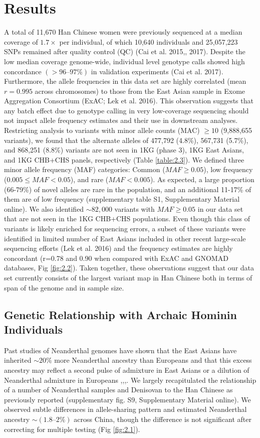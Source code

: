 \section{Results}
A total of 11,670 Han Chinese women were previously sequenced at a median coverage of $1.7\times$ per individual, of which 10,640 individuals and 25,057,223 SNPs remained after quality control (QC) (Cai et al. 2015,, 2017). Despite the low median coverage genome-wide, individual level genotype calls showed high concordance $(>96–97\%)$ in validation experiments (Cai et al. 2017). Furthermore, the allele frequencies in this data set are highly correlated (mean $r=0.995$ across chromosomes) to those from the East Asian sample in Exome Aggregation Consortium (ExAC; Lek et al. 2016). This observation suggests that any batch effect due to genotype calling in very low-coverage sequencing should not impact allele frequency estimates and their use in downstream analyses.
Restricting analysis to variants with minor allele counts (MAC) $\ge10$ (9,888,655 variants), we found that the alternate alleles of 477,792 (4.8\%), 567,731 (5.7\%), and 868,251 (8.8\%) variants are not seen in 1KG (phase 3), 1KG East Asians, and 1KG CHB+CHS panels, respectively (Table \ref{table:2.3}). We defined three minor allele frequency (MAF) categories: Common ($MAF \ge 0.05$), low frequency ($0.005\le MAF < 0.05$), and rare ($MAF < 0.005$). As expected, a large proportion (66-79\%) of novel alleles are rare in the population, and an additional 11-17\% of them are of low frequency (supplementary table S1, Supplementary Material online). We also identified $\sim82,000$ variants with $MAF \ge 0.05$ in our data set that are not seen in the 1KG CHB+CHS populations. Even though this class of variants is likely enriched for sequencing errors, a subset of these variants were identified in limited number of East Asians included in other recent large-scale sequencing efforts (Lek et al. 2016) and the frequency estimates are highly concordant (r=0.78 and 0.90 when compared with ExAC and GNOMAD databases, Fig \ref{fig:2.2}). Taken together, these observations suggest that our data set currently consists of the largest variant map in Han Chinese both in terms of span of the genome and in sample size.
\subsection{Genetic Relationship with Archaic Hominin Individuals}
Past studies of Neanderthal genomes have shown that the East Asians have inherited $\sim20\%$ more Neanderthal ancestry than Europeans and that this excess ancestry may reflect a second pulse of admixture in East Asians or a dilution of Neanderthal admixture in Europeans \cite{prfer2014complete},\cite{sankararaman2014genomic},\cite{vernot2014resurrecting},\cite{kim2015selection}. We largely recapitulated the relationship of a number of Neanderthal samples and Denisovan to the Han Chinese as previously reported (supplementary fig. S9, Supplementary Material online). We observed subtle differences in allele-sharing pattern and estimated Neanderthal ancestry $\sim(1.8–2\%)$ across China, though the difference is not significant after correcting for multiple testing (Fig \ref{fig:2.1}).
